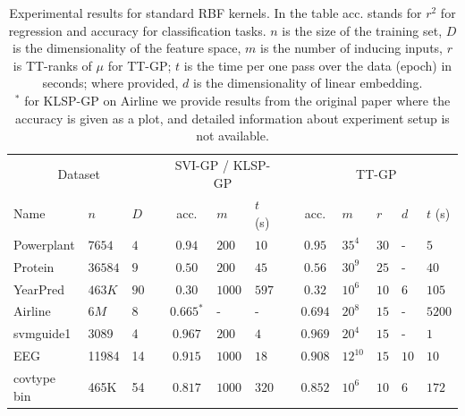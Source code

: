 \begin{table}[!t]
  \caption[]{Experimental results for standard RBF kernels. In the table acc. stands for $r^2$ for regression and accuracy
          for classification tasks. $n$ is the size of the
          training set, $D$ is the dimensionality of the feature space,
          $m$ is the number of inducing inputs, $r$ is TT-ranks of $\mu$ for TT-GP; $t$ is the time per one pass over
          the data (epoch) in seconds; where provided, $d$ is the dimensionality of linear embedding.\\
          $^*$ for KLSP-GP on Airline we provide results from the original
          paper where the accuracy is given as a plot, and detailed
          information about experiment setup is not available.
          }
  \label{se_results}
  \centering
  \begin{tabular}{lll l cll l cllll}
    \toprule
    \multicolumn{3}{c}{Dataset} && \multicolumn{3}{c}{SVI-GP / KLSP-GP} && \multicolumn{5}{c}{TT-GP} \\
    \cmidrule{1-3}
    \cmidrule{5-7}
    \cmidrule{9-13}

    Name & $n$ & $D$ &&
    acc. & $m$ & $t$ (s) &&
    acc. & $m$ & $r$ & $d$ & $t$ (s)\\
    \midrule

    Powerplant & $7654$ & $4$ &&
    $0.94$ & $200$ & $10$ &&
    $0.95$ & $35^4$ & $30$ & - & $5$ \\

    Protein & $36584$ & $9$ &&
    $0.50$ & $200$ & $45$ &&
    $0.56$ & $30^9$ & $25$ & - & $40$ \\

    YearPred & $463K$ & $90$ &&
    $0.30$ & $1000$ & $597$ &&
    $0.32$ & $10^6$ & $10$ & $6$ & $105$ \\

    \midrule
    Airline & $6M$ & $8$ &&
    $0.665^*$ & - & - &&
    $0.694$ & $20^8$ & $15$ & - & $5200$ \\

    svmguide1 & 3089 & 4 &&
    $0.967$ & $200$ & $4$ &&
    $0.969$ & $20^4$ & $15$ & - & $1$\\

    EEG & 11984 & 14 &&
    $0.915$ & $1000$ & $18$ &&
    $0.908$ & $12^{10}$ & $15$ & $10$ & $10$\\

    covtype bin & 465K & 54 &&
    $0.817$ & $1000$ & $320$ &&
    $0.852$ & $10^6$ & $10$ & $6$ & $172$\\
    \bottomrule
  \end{tabular}
\end{table}

